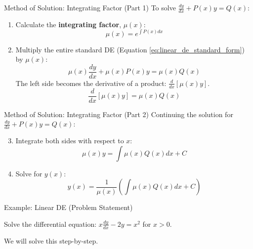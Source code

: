 \documentclass[10pt,aspectratio=169]{beamer}
\begin{document}
\begin{frame}{Method of Solution: Integrating Factor (Part 1)}
    To solve $\frac{dy}{dx} + P(x)y = Q(x)$:
    \begin{enumerate}
        \item Calculate the \textbf{integrating factor}, $\mu(x)$:
        \begin{equation}
            \mu(x) = e^{\int P(x)dx}
            \label{eq:integrating_factor}
        \end{equation}
        \item Multiply the entire standard DE (Equation \ref{eq:linear_de_standard_form}) by $\mu(x)$:
        \begin{equation}
            \mu(x)\frac{dy}{dx} + \mu(x)P(x)y = \mu(x)Q(x)
        \end{equation}
        The left side becomes the derivative of a product: $\frac{d}{dx}[\mu(x)y]$.
        \begin{equation}
            \frac{d}{dx}[\mu(x)y] = \mu(x)Q(x)
        \end{equation}
    \end{enumerate}
\end{frame}

\begin{frame}{Method of Solution: Integrating Factor (Part 2)}
    Continuing the solution for $\frac{dy}{dx} + P(x)y = Q(x)$:
    \begin{enumerate}
        \setcounter{enumi}{2} %
        \item Integrate both sides with respect to $x$:
        \begin{equation}
            \mu(x)y = \int \mu(x)Q(x)dx + C
        \end{equation}
        \item Solve for $y(x)$:
        \begin{equation}
            y(x) = \frac{1}{\mu(x)} \left( \int \mu(x)Q(x)dx + C \right)
            \label{eq:linear_de_solution}
        \end{equation}
    \end{enumerate}
\end{frame}

\begin{frame}{Example: Linear DE (Problem Statement)}
    \begin{problembox}
        Solve the differential equation: $x\frac{dy}{dx} - 2y = x^2$ for $x > 0$.
    \end{problembox}
    \vspace{1em}
    We will solve this step-by-step.
\end{frame}
\end{document}
